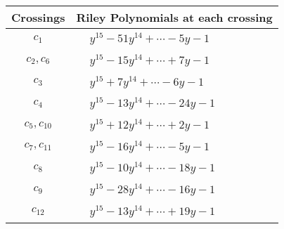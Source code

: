 \documentclass[1p]{elsarticle_modified}
\theoremstyle{definition}
\begin{document}
\begin{tabular}{m{50pt}|m{274pt}}
Crossings & \hspace{64pt}Riley Polynomials at each crossing \\
\hline $$\begin{aligned}c_{1}\end{aligned}$$&$\begin{aligned}
&y^{15}-51 y^{14}+\cdots-5 y-1
\end{aligned}$\\
\hline $$\begin{aligned}c_{2},c_{6}\end{aligned}$$&$\begin{aligned}
&y^{15}-15 y^{14}+\cdots+7 y-1
\end{aligned}$\\
\hline $$\begin{aligned}c_{3}\end{aligned}$$&$\begin{aligned}
&y^{15}+7 y^{14}+\cdots-6 y-1
\end{aligned}$\\
\hline $$\begin{aligned}c_{4}\end{aligned}$$&$\begin{aligned}
&y^{15}-13 y^{14}+\cdots-24 y-1
\end{aligned}$\\
\hline $$\begin{aligned}c_{5},c_{10}\end{aligned}$$&$\begin{aligned}
&y^{15}+12 y^{14}+\cdots+2 y-1
\end{aligned}$\\
\hline $$\begin{aligned}c_{7},c_{11}\end{aligned}$$&$\begin{aligned}
&y^{15}-16 y^{14}+\cdots-5 y-1
\end{aligned}$\\
\hline $$\begin{aligned}c_{8}\end{aligned}$$&$\begin{aligned}
&y^{15}-10 y^{14}+\cdots-18 y-1
\end{aligned}$\\
\hline $$\begin{aligned}c_{9}\end{aligned}$$&$\begin{aligned}
&y^{15}-28 y^{14}+\cdots-16 y-1
\end{aligned}$\\
\hline $$\begin{aligned}c_{12}\end{aligned}$$&$\begin{aligned}
&y^{15}-13 y^{14}+\cdots+19 y-1
\end{aligned}$\\
\hline
\end{tabular}\\~\\
\end{document}
